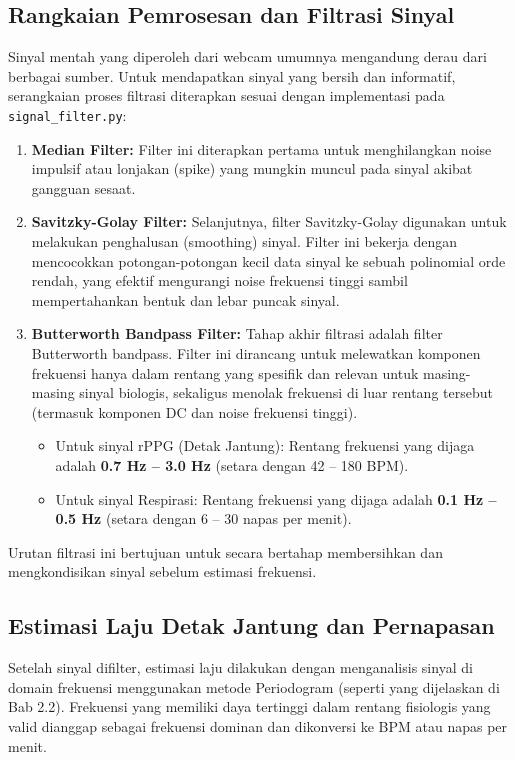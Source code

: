\documentclass[11pt,a4paper]{article}
\begin{document}
\subsection{Rangkaian Pemrosesan dan Filtrasi Sinyal}
Sinyal mentah yang diperoleh dari webcam umumnya mengandung derau dari berbagai sumber. Untuk mendapatkan sinyal yang bersih dan informatif, serangkaian proses filtrasi diterapkan sesuai dengan implementasi pada \texttt{signal\_filter.py}:
\begin{enumerate}
    \item \textbf{Median Filter:} Filter ini diterapkan pertama untuk menghilangkan noise impulsif atau lonjakan (spike) yang mungkin muncul pada sinyal akibat gangguan sesaat.
    \item \textbf{Savitzky-Golay Filter:} Selanjutnya, filter Savitzky-Golay digunakan untuk melakukan penghalusan (smoothing) sinyal. Filter ini bekerja dengan mencocokkan potongan-potongan kecil data sinyal ke sebuah polinomial orde rendah, yang efektif mengurangi noise frekuensi tinggi sambil mempertahankan bentuk dan lebar puncak sinyal.
    \item \textbf{Butterworth Bandpass Filter:} Tahap akhir filtrasi adalah filter Butterworth bandpass. Filter ini dirancang untuk melewatkan komponen frekuensi hanya dalam rentang yang spesifik dan relevan untuk masing-masing sinyal biologis, sekaligus menolak frekuensi di luar rentang tersebut (termasuk komponen DC dan noise frekuensi tinggi).
    \begin{itemize}
        \item Untuk sinyal rPPG (Detak Jantung): Rentang frekuensi yang dijaga adalah \textbf{0.7 Hz – 3.0 Hz} (setara dengan 42 – 180 BPM).
        \item Untuk sinyal Respirasi: Rentang frekuensi yang dijaga adalah \textbf{0.1 Hz – 0.5 Hz} (setara dengan 6 – 30 napas per menit).
    \end{itemize}
\end{enumerate}
Urutan filtrasi ini bertujuan untuk secara bertahap membersihkan dan mengkondisikan sinyal sebelum estimasi frekuensi.

\subsection{Estimasi Laju Detak Jantung dan Pernapasan}
Setelah sinyal difilter, estimasi laju dilakukan dengan menganalisis sinyal di domain frekuensi menggunakan metode Periodogram (seperti yang dijelaskan di Bab 2.2). Frekuensi yang memiliki daya tertinggi dalam rentang fisiologis yang valid dianggap sebagai frekuensi dominan dan dikonversi ke BPM atau napas per menit.
\end{document}

